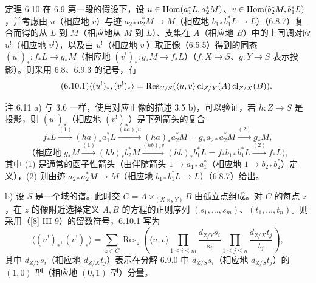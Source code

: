 \begin{statement}{定理 6.10}
在 6.9 第一段的假设下，设 $u\in\operatorname{Hom}(a_1^*L,a_2^*M)$、$v\in\operatorname{Hom}(b_2^*M,b_1^*L)$，并考虑由 $u$（相应地 $v$）与迹 $a_{2*}a_2^*M\to M$（相应地 $b_{1*}b_1^*L\to L$）（6.8.7）复合而得的从 $L$ 到 $M$（相应地从 $M$ 到 $L$）、支集在 $A$（相应地 $B$）中的上同调对应 $u^!$（相应地 $v^!$），以及由 $u^!$（相应地 $v^!$）取正像（6.5.5）得到的同态 $(u^!)_*:f_*L\to g_*M$（相应地 $(v^!)_*:g_*M\to f_*L$）（$f:X\to S$、$g:Y\to S$ 表示投影）。则采用 6.8、6.9.3 的记号，有
\begin{equation}
\tag{6.10.1}
\langle (u^!)_*,(v^!)_*\rangle=\operatorname{Res}_{C/S}(\langle u,v\rangle\operatorname{cl}_{Z/Y}(A)\operatorname{cl}_{Z/X}(B)).
\end{equation}
\end{statement}

\begin{statement}{注 6.11}
a) 与 3.6 一样，使用对应正像的描述 3.5 b)，可以验证，若 $h:Z\to S$ 是投影，则 $(u^!)_*$（相应地 $(v^!)_*$）是下列箭头的复合
\[
f_*L\xrightarrow{(1)}(ha)_*a_1^*L\xrightarrow{(ha)_*u}(ha)_*a_2^*M=g_*a_{2*}a_2^*M\xrightarrow{(2)}g_*M,
\]
\[
\text{（相应地 }g_*M\xrightarrow{(1)}(hb)_*b_2^*M\xrightarrow{(hb)_*v}(hb)_*b_1^*L=f_*b_{1*}b_1^*L\xrightarrow{(2)}f_*L\text{)},
\]
其中 (1) 是通常的函子性箭头（由伴随箭头 $1\to a_{1*}a_1^*$（相应地 $1\to b_{2*}b_2^*$）定义），(2) 则由迹 $a_{2*}a_2^*M\to M$（相应地 $b_{1*}b_1^*L\to L$）（6.8.7）给出。

b) 设 $S$ 是一个域的谱。此时交 $C=A\times_{(X\times_S Y)}B$ 由孤立点组成。对 $C$ 的每点 $z$，在 $z$ 的像附近选择定义 $A,B$ 的方程的正则序列 $(s_1,\ldots,s_m)$、$(t_1,\ldots,t_n)$。则采用（[8] III 9）的留数符号，6.10.1 写为
\begin{equation}
\tag{6.11.1}
\langle (u^!)_*,(v^!)_*\rangle=
\sum_{z\in C}\operatorname{Res}_z\left(\langle u,v\rangle
\prod_{1\le i\le m}\frac{d_{Z/Y}s_i}{s_i}
\prod_{1\le j\le n}\frac{d_{Z/X}t_j}{t_j}\right),
\end{equation}
其中 $d_{Z/Y}s_i$（相应地 $d_{Z/X}t_j$）表示在分解 6.9.0 中 $d_{Z/S}s_i$（相应地 $d_{Z/S}t_j$）的 $(1,0)$ 型（相应地 $(0,1)$ 型）分量。
\end{statement}


